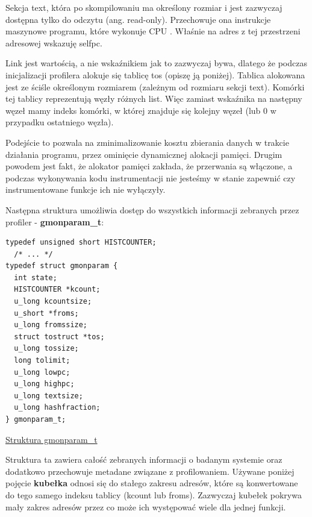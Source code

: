 \documentclass[shortabstract]{iithesis}
\theoremstyle{definition} \newtheorem*{definition}{Definicja}
\theoremstyle{definition} \newtheorem*{example}{Przykład}
\theoremstyle{definition} \newtheorem*{remark}{Uwaga}
\newenvironment{longlisting}{\captionsetup{type=listing}}{}
\begin{document}
Sekcja text, która po skompilowaniu ma określony rozmiar i jest zazwyczaj dostępna tylko do odczytu (ang. read-only). Przechowuje ona instrukcje maszynowe programu, które wykonuje CPU \cite{bib:apue}. Właśnie na adres z tej przestrzeni adresowej wskazuję selfpc.

Link jest wartością, a nie wskaźnikiem jak to zazwyczaj bywa, dlatego że podczas inicjalizacji profilera alokuje się tablicę tos (opiszę ją poniżej). Tablica alokowana jest ze ściśle określonym rozmiarem (zależnym od rozmiaru sekcji text). Komórki tej tablicy reprezentują węzły różnych list. Więc zamiast wskaźnika na następny węzeł mamy indeks komórki, w której znajduje się kolejny węzeł (lub 0 w przypadku ostatniego węzła).

Podejście to pozwala na zminimalizowanie kosztu zbierania danych w trakcie działania programu, przez ominięcie dynamicznej alokacji pamięci. Drugim powodem jest fakt, że alokator pamięci zakłada, że przerwania są włączone, a podczas wykonywania kodu instrumentacji nie jesteśmy w stanie zapewnić czy instrumentowane funkcje ich nie wyłączyły.

Następna struktura umożliwia dostęp do wszystkich informacji zebranych przez profiler - \textbf{gmonparam\_t}:

\begin{longlisting}
  \begin{verbatim}
typedef unsigned short HISTCOUNTER;
  /* ... */
typedef struct gmonparam {
  int state;
  HISTCOUNTER *kcount;
  u_long kcountsize;
  u_short *froms;
  u_long fromssize;
  struct tostruct *tos;
  u_long tossize;
  long tolimit;
  u_long lowpc;
  u_long highpc;
  u_long textsize;
  u_long hashfraction;
} gmonparam_t;
  \end{verbatim}
  \caption{\href{https://mimiker.ii.uni.wroc.pl/source/xref/mimiker/include/sys/gmon.h?r=27b8c19a\#111}{Struktura gmonparam\_t}}
  \label{lst:structgmonparam}
\end{longlisting}

Struktura ta zawiera całość zebranych informacji o badanym systemie oraz dodatkowo przechowuje metadane związane z profilowaniem. Używane poniżej pojęcie \textbf{kubełka} odnosi się do stałego zakresu adresów, które są konwertowane do tego samego indeksu tablicy (kcount lub froms). Zazwyczaj kubełek pokrywa mały zakres adresów przez co może ich występować wiele dla jednej funkcji.
\end{document}
